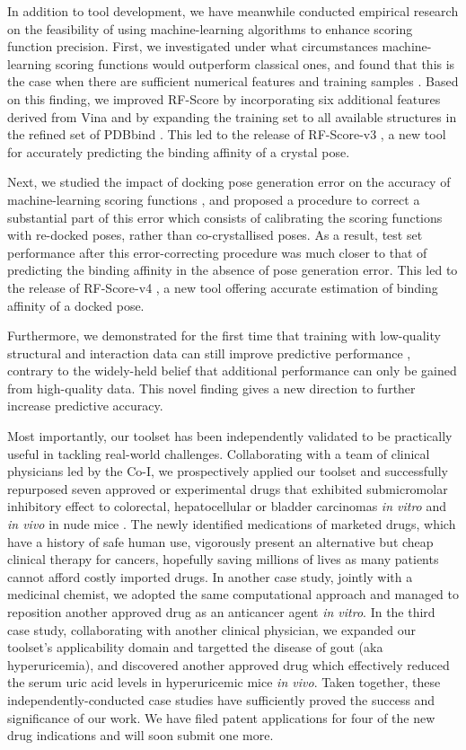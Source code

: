 \documentclass[a4paper,12pt]{article}
\begin{document}
In addition to tool development, we have meanwhile conducted empirical research on the feasibility of using machine-learning algorithms to enhance scoring function precision. First, we investigated under what circumstances machine-learning scoring functions would outperform classical ones, and found that this is the case when there are sufficient numerical features and training samples \citep{1432}. Based on this finding, we improved RF-Score by incorporating six additional features derived from Vina and by expanding the training set to all available structures in the refined set of PDBbind \citep{1633}. This led to the release of RF-Score-v3 \citep{1647}, a new tool for accurately predicting the binding affinity of a crystal pose.

Next, we studied the impact of docking pose generation error on the accuracy of machine-learning scoring functions \citep{1795,1797,1434}, and proposed a procedure to correct a substantial part of this error which consists of calibrating the scoring functions with re-docked poses, rather than co-crystallised poses. As a result, test set performance after this error-correcting procedure was much closer to that of predicting the binding affinity in the absence of pose generation error. This led to the release of RF-Score-v4 \citep{1795}, a new tool offering accurate estimation of binding affinity of a docked pose.

Furthermore, we demonstrated for the first time that training with low-quality structural and interaction data can still improve predictive performance \citep{1663}, contrary to the widely-held belief that additional performance can only be gained from high-quality data. This novel finding gives a new direction to further increase predictive accuracy.

Most importantly, our toolset has been independently validated to be practically useful in tackling real-world challenges. Collaborating with a team of clinical physicians led by the Co-I, we prospectively applied our toolset and successfully repurposed seven approved or experimental drugs that exhibited submicromolar inhibitory effect to colorectal, hepatocellular or bladder carcinomas \textit{in vitro} and \textit{in vivo} in nude mice \citep{1667,1681}. The newly identified medications of marketed drugs, which have a history of safe human use, vigorously present an alternative but cheap clinical therapy for cancers, hopefully saving millions of lives as many patients cannot afford costly imported drugs. In another case study, jointly with a medicinal chemist, we adopted the same computational approach and managed to reposition another approved drug as an anticancer agent \textit{in vitro}. In the third case study, collaborating with another clinical physician, we expanded our toolset's applicability domain and targetted the disease of gout (aka hyperuricemia), and discovered another approved drug which effectively reduced the serum uric acid levels in hyperuricemic mice \textit{in vivo}. Taken together, these independently-conducted case studies have sufficiently proved the success and significance of our work. We have filed patent applications for four of the new drug indications and will soon submit one more.
\end{document}

